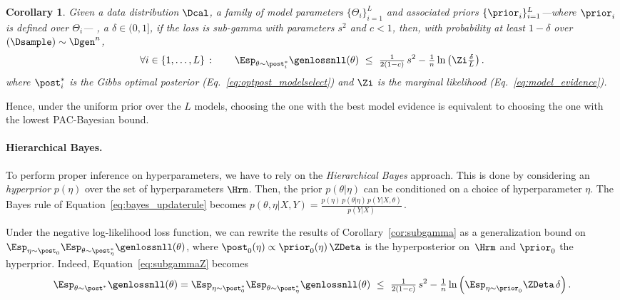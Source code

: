 \documentclass{article}
\newtheorem{cor}[thm]{Corollary}
\theoremstyle{definition}
\theoremstyle{plain}
\begin{document}
\begin{cor}%
	\label{cor:pacbayescatoni_modelselect}
	Given a data distribution $\Dcal$, a family of model parameters $\{\Theta_i\}_{i=1}^L$  and associated priors $\{\prior_i\}_{i=1}^L$---where $\prior_i$ is defined over $\Theta_i$--- , a $\delta \in (0,1]$,  if the loss is sub-gamma with parameters $s^2$ and $c<1$, then, with probability at least $1 - \delta$ over $(\Dsample) \sim  \Dgen^n $, 
	\begin{equation*} %
	\forall i \in \{1,\ldots,L\}\,:\qquad
		\Esp_{\theta\sim\post_i^*} \genlossnll(\theta) 
		\ \leq \ 
%
\tfrac1{2(1-c)}\, s^2 - \tfrac{1}{n}\ln\left( \Zi \tfrac\delta L\right).
	\end{equation*}
	where $\post^*_i$ is the Gibbs optimal posterior (Eq.~\ref{eq:optpost_modelselect})
%
%
%
%
	and $\Zi$ is the marginal likelihood (Eq.~\ref{eq:model_evidence}).
\end{cor}

%
%
%
%
%
%
%
%
%
Hence, under the uniform prior over the $L$ models, choosing the one with the best model evidence is equivalent to choosing the one with the lowest PAC-Bayesian bound. 
%

\paragraph{Hierarchical Bayes.}
To perform proper inference on hyperparameters, we have to rely on the \emph{Hierarchical Bayes} approach. This is done by considering an \emph{hyperprior} $p(\eta)$ over the set of hyperparameters $\Hrm$. Then, the prior $p(\theta|\eta)$ can be conditioned on a choice of hyperparameter $\eta$. 
%
%
%
%
The Bayes rule of Equation~\eqref{eq:bayes_updaterule} becomes
%
%
$p(\theta,\eta|X,Y) 
=\frac{p(\eta)\, p(\theta | \eta) \,p(Y|X,\theta)}{p(Y|X)}\,.$
%
%
%

Under the negative log-likelihood loss function, we can rewrite the results of Corollary~\ref{cor:subgamma} as a generalization bound 
on $\Esp_{\eta\sim\post_0} \Esp_{\theta\sim\post_\eta^*} \genlossnll(\theta) $, where $\post_0(\eta) \propto {\prior_0(\eta) \,\ZDeta}$ is the hyperposterior on~$\Hrm$ and $\prior_0$ the hyperprior. Indeed, Equation~\eqref{eq:subgammaZ} becomes
		\begin{equation} \label{eq:h_bound}
		\Esp_{\theta\sim\post^*} \genlossnll(\theta) 
		=  \Esp_{\eta\sim\post_0^*} \Esp_{\theta\sim\post_\eta^*} \genlossnll(\theta) 
		\ \leq\ 
\tfrac1{2(1-c)}\, s^2 - \tfrac{1}{n}\ln\left( \Esp_{\eta\sim\prior_0}  \ZDeta\,\delta \right). 
%
		\end{equation}
\end{document}

